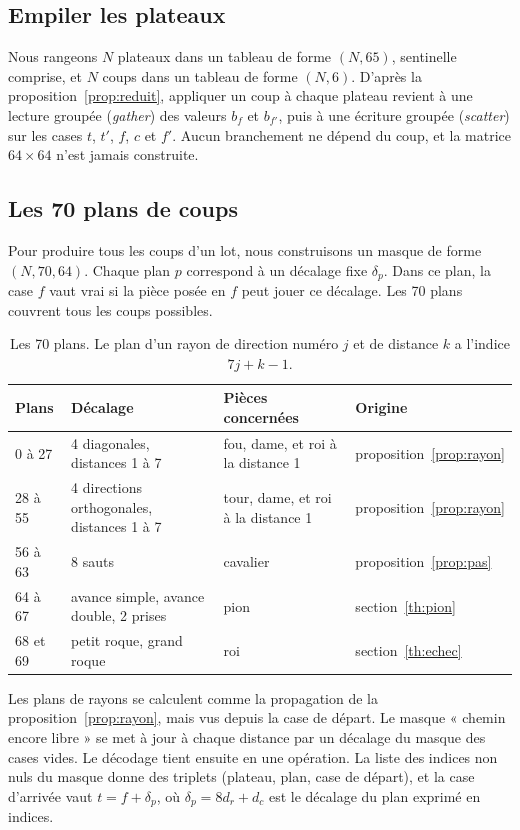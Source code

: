 \documentclass[11pt,a4paper]{article}
\newcounter{calcul}
\theoremstyle{plain}
\begin{document}
\subsection{Empiler les plateaux}\label{th:lots}
Nous rangeons $N$ plateaux dans un tableau de forme $(N, 65)$, sentinelle comprise, et $N$ coups
dans un tableau de forme $(N, 6)$. D'après la proposition~\ref{prop:reduit}, appliquer un coup
à chaque plateau revient à une lecture groupée (\emph{gather}) des valeurs $b_f$ et $b_{f'}$, puis
à une écriture groupée (\emph{scatter}) sur les cases $t$, $t'$, $f$, $c$ et $f'$. Aucun
branchement ne dépend du coup, et la matrice $64\times64$ n'est jamais construite.

\subsection{Les 70 plans de coups}\label{th:plans}
Pour produire tous les coups d'un lot, nous construisons un masque de forme $(N, 70, 64)$. Chaque
plan $p$ correspond à un décalage fixe $\delta_p$. Dans ce plan, la case $f$ vaut vrai si la pièce
posée en $f$ peut jouer ce décalage. Les 70 plans couvrent tous les coups possibles.

\begin{table}[H]
\centering\small
\begin{tabular}{llll}
\toprule
Plans & Décalage & Pièces concernées & Origine\\
\midrule
0 à 27 & 4 diagonales, distances 1 à 7 & fou, dame, et roi à la distance 1 &
proposition~\ref{prop:rayon}\\
28 à 55 & 4 directions orthogonales, distances 1 à 7 & tour, dame, et roi à la distance 1 &
proposition~\ref{prop:rayon}\\
56 à 63 & 8 sauts & cavalier & proposition~\ref{prop:pas}\\
64 à 67 & avance simple, avance double, 2 prises & pion & section~\ref{th:pion}\\
68 et 69 & petit roque, grand roque & roi & section~\ref{th:echec}\\
\bottomrule
\end{tabular}
\caption{Les 70 plans. Le plan d'un rayon de direction numéro $j$ et de distance $k$ a l'indice
$7j + k - 1$.}
\end{table}

Les plans de rayons se calculent comme la propagation de la proposition~\ref{prop:rayon}, mais vus
depuis la case de départ. Le masque « chemin encore libre » se met à jour à chaque distance par un
décalage du masque des cases vides. Le décodage tient ensuite en une opération. La liste des
indices non nuls du masque donne des triplets (plateau, plan, case de départ), et la case
d'arrivée vaut $t = f + \delta_p$, où $\delta_p = 8 d_r + d_c$ est le décalage du plan exprimé en
indices.
\end{document}

